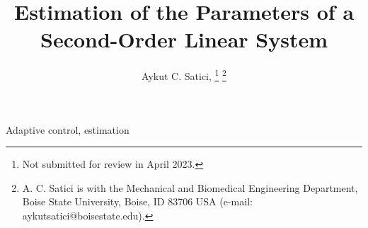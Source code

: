 \documentclass[journal,twoside,web]{ieeecolor}
\begin{document}
\title{Estimation of the Parameters of a Second-Order Linear System} 
\author{
    Aykut C. Satici, 
    \thanks{Not submitted for review in April 2023.}
    \thanks{A. C. Satici is with the Mechanical and Biomedical Engineering Department, Boise State University, Boise, ID 83706 USA
    (e-mail: aykutsatici@boisestate.edu).}
}
\maketitle

  

\begin{IEEEkeywords}
    Adaptive control, estimation
\end{IEEEkeywords}






        
  
\end{document}
